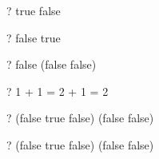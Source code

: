 \begin{zed}
  \vdash? true \lor false
\end{zed}

\begin{zed}
  \vdash? false \lor true
\end{zed}

\begin{zed}
  \vdash? false \lor (false \lor \lnot false)
\end{zed}

\begin{zed}
  \vdash? 1 + 1 = 2 \lor {} + 1 = 2
\end{zed}

\begin{zed}
  \vdash? (false \lor \lnot \lnot true \lor false) \lor
          (false \lor \lnot false)
\end{zed}

\begin{zed}
  \vdash? (false \lor \lnot \lnot true \lor false) \land
          (false \lor \lnot false)
\end{zed}
